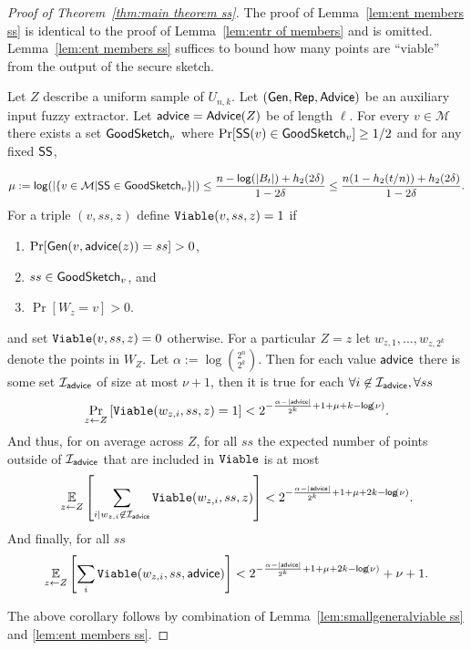 \begin{proof}[Proof of Theorem~\ref{thm:main theorem ss}]
The proof of Lemma~\ref{lem:ent members ss} is identical to the proof of Lemma~\ref{lem:entr of members} and is omitted. 
Lemma~\ref{lem:ent members ss} suffices to bound how many points are ``viable'' from the output of the secure sketch.


\begin{corollary}
\label{corollary:info loss ss}
Let $Z$ describe a uniform sample of $U_{n,k}$.  Let $({\mathsf{Gen}}, {\mathsf{Rep}}, {\mathsf{Advice}})$ be an auxiliary input fuzzy extractor.  Let ${\mathsf{advice}} = {\mathsf{Advice}}(Z)$ be of length $\ell$.       For every $v\in \mathcal{M}$ there exists a set $\mathsf{GoodSketch}_v$ where $\Pr[{\mathsf{SS}}(v)\in \mathsf{GoodSketch}_v] \ge 1/2$ and for any fixed ${\mathsf{SS}}$,
    
    \[
    \mu:=\mathsf{log}\!\left(|\{v \in \mathcal{M} | {\mathsf{SS}} \in \mathsf{GoodSketch}_v\}|\right) \le \frac{n - \mathsf{log}\!\left(|B_t|\right) +h_2(2\delta)}{1-2\delta} \le \frac{n(1-h_2(t/n)) +h_2(2\delta)}{1-2\delta}.
    \]
For a triple $(v, ss, z)$ define $\mathtt{Viable}(v, ss, z)=1$ if
\begin{enumerate}
\itemsep0em
\item $\Pr[{\mathsf{Gen}}(v, {\mathsf{advice}}(z)) = ss]>0$,
\item $ss\in\mathsf{GoodSketch}_v$, and
\item $\Pr[W_z = v]>0$.
\end{enumerate}
and set $\mathtt{Viable}(v, ss, z)=0$ otherwise. 
 For a particular $Z=z$ let $w_{z,1},..., w_{z,2^k}$ denote the points in $W_Z$. Let $\alpha:= \log {2^n\choose 2^k}$.  
 Then for each value ${\mathsf{advice}}$ there is some set $\mathcal{I}_{{\mathsf{advice}}}$ of size at most $\nu+1$, then it is true for each $\forall i\not \in \mathcal{I}_{\mathsf{advice}}, \forall ss$
\[
\Pr_{z\leftarrow Z}\left[\mathtt{Viable}(w_{z,i},ss,z) =1\right]< 2^{-\frac{\alpha-|{\mathsf{advice}}|}{2^k}+1+\mu + k-\mathsf{log}\!\left(\nu\right)}.
\]
And thus, for on average across $Z$, for all $ss$ the expected number of points outside of $\mathcal{I}_{\mathsf{advice}}$ that are included in $\mathtt{Viable}$ is at most 
\begin{align*}
\operatorname*{\mathbb{E}}_{z\leftarrow Z} \left[\sum_{i | w_{z,i}\not\in\mathcal{I}_{\mathsf{advice}}} \mathtt{Viable}(w_{z,i}, ss, z) \right]< 2^{-\frac{\alpha- |{\mathsf{advice}}|}{2^k}+1+\mu+2k-\mathsf{log}\!\left(\nu\right)}.
\end{align*}
And finally, for all $ss$
\begin{align*}
\operatorname*{\mathbb{E}}_{z\leftarrow Z} \left[\sum_{i }  \mathtt{Viable}(w_{z,i}, ss, {\mathsf{advice}})  \right]< 2^{-\frac{\alpha-|{\mathsf{advice}}|}{2^k}+1+\mu+2k-\mathsf{log}\!\left(\nu\right)}+\nu+1.
\end{align*}
\end{corollary}
\noindent
The above corollary follows by combination of Lemma~\ref{lem:smallgeneralviable ss} and \ref{lem:ent members ss}.
\end{proof}
